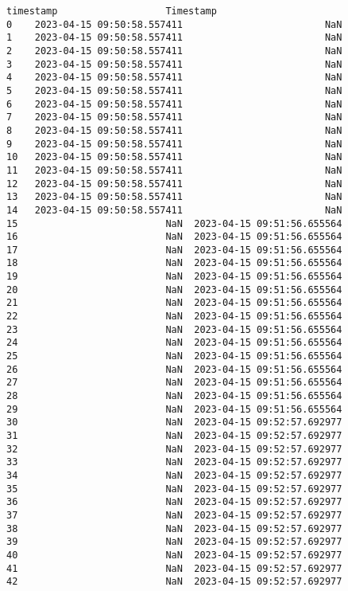 \documentclass[11pt]{article}
\begin{document}
\begin{tcolorbox}[breakable, size=fbox, boxrule=.5pt, pad at break*=1mm, opacityfill=0]
\begin{Verbatim}[commandchars=\\\{\}]
                      timestamp                   Timestamp
0    2023-04-15 09:50:58.557411                         NaN
1    2023-04-15 09:50:58.557411                         NaN
2    2023-04-15 09:50:58.557411                         NaN
3    2023-04-15 09:50:58.557411                         NaN
4    2023-04-15 09:50:58.557411                         NaN
5    2023-04-15 09:50:58.557411                         NaN
6    2023-04-15 09:50:58.557411                         NaN
7    2023-04-15 09:50:58.557411                         NaN
8    2023-04-15 09:50:58.557411                         NaN
9    2023-04-15 09:50:58.557411                         NaN
10   2023-04-15 09:50:58.557411                         NaN
11   2023-04-15 09:50:58.557411                         NaN
12   2023-04-15 09:50:58.557411                         NaN
13   2023-04-15 09:50:58.557411                         NaN
14   2023-04-15 09:50:58.557411                         NaN
15                          NaN  2023-04-15 09:51:56.655564
16                          NaN  2023-04-15 09:51:56.655564
17                          NaN  2023-04-15 09:51:56.655564
18                          NaN  2023-04-15 09:51:56.655564
19                          NaN  2023-04-15 09:51:56.655564
20                          NaN  2023-04-15 09:51:56.655564
21                          NaN  2023-04-15 09:51:56.655564
22                          NaN  2023-04-15 09:51:56.655564
23                          NaN  2023-04-15 09:51:56.655564
24                          NaN  2023-04-15 09:51:56.655564
25                          NaN  2023-04-15 09:51:56.655564
26                          NaN  2023-04-15 09:51:56.655564
27                          NaN  2023-04-15 09:51:56.655564
28                          NaN  2023-04-15 09:51:56.655564
29                          NaN  2023-04-15 09:51:56.655564
30                          NaN  2023-04-15 09:52:57.692977
31                          NaN  2023-04-15 09:52:57.692977
32                          NaN  2023-04-15 09:52:57.692977
33                          NaN  2023-04-15 09:52:57.692977
34                          NaN  2023-04-15 09:52:57.692977
35                          NaN  2023-04-15 09:52:57.692977
36                          NaN  2023-04-15 09:52:57.692977
37                          NaN  2023-04-15 09:52:57.692977
38                          NaN  2023-04-15 09:52:57.692977
39                          NaN  2023-04-15 09:52:57.692977
40                          NaN  2023-04-15 09:52:57.692977
41                          NaN  2023-04-15 09:52:57.692977
42                          NaN  2023-04-15 09:52:57.692977

\end{Verbatim}
\end{tcolorbox}
\end{document}

